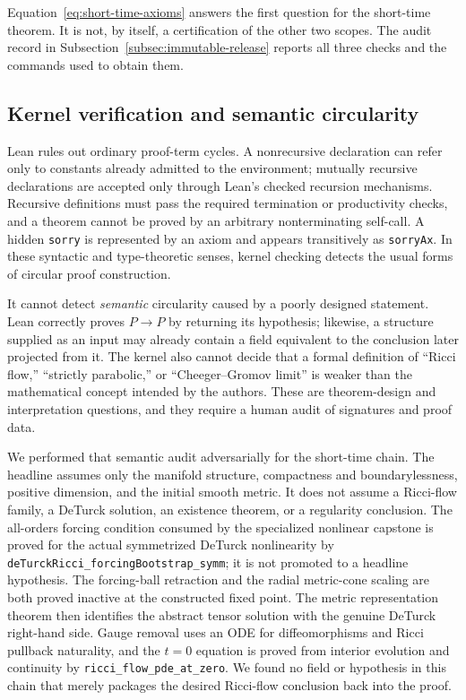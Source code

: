\documentclass[11pt]{article}
\theoremstyle{plain}
\theoremstyle{definition}
\theoremstyle{remark}
\newcommand{\leanref}[1]{\nolinkurl{#1}}
\begin{document}
Equation~\eqref{eq:short-time-axioms} answers the first question for the
short-time theorem.  It is not, by itself, a certification of the other two
scopes.  The audit record in Subsection~\ref{subsec:immutable-release} reports
all three checks and the commands used to obtain them.

\subsection{Kernel verification and semantic circularity}
\label{subsec:kernel-circularity}

Lean rules out ordinary proof-term cycles.  A nonrecursive declaration can
refer only to constants already admitted to the environment; mutually
recursive declarations are accepted only through Lean's checked recursion
mechanisms.  Recursive definitions must pass the required termination or
productivity checks, and a theorem cannot be proved by an arbitrary
nonterminating self-call.  A hidden \texttt{sorry} is represented by
an axiom and appears transitively as \texttt{sorryAx}.  In these syntactic and
type-theoretic senses, kernel checking detects the usual forms of circular
proof construction.

It cannot detect \emph{semantic} circularity caused by a poorly designed
statement.  Lean correctly proves $P\to P$ by returning its hypothesis;
likewise, a structure supplied as an input may already contain a field
equivalent to the conclusion later projected from it.  The kernel also cannot
decide that a formal definition of ``Ricci flow,'' ``strictly parabolic,'' or
``Cheeger--Gromov limit'' is weaker than the mathematical concept intended by
the authors.  These are theorem-design and interpretation questions, and they
require a human audit of signatures and proof data.

We performed that semantic audit adversarially for the short-time chain.  The
headline assumes only the manifold structure, compactness and
boundarylessness, positive dimension, and the initial smooth metric.  It does
not assume a Ricci-flow family, a DeTurck solution, an existence theorem, or a
regularity conclusion.  The all-orders forcing condition consumed by the
specialized nonlinear capstone is proved for the actual symmetrized DeTurck
nonlinearity by \leanref{deTurckRicci_forcingBootstrap_symm}; it is not promoted
to a headline hypothesis.  The forcing-ball retraction and the radial
metric-cone scaling are both proved inactive at the constructed fixed point.
The metric representation theorem then identifies the abstract tensor
solution with the genuine DeTurck right-hand side.  Gauge removal uses an ODE
for diffeomorphisms and Ricci pullback naturality, and the $t=0$ equation is
proved from interior evolution and continuity by
\leanref{ricci_flow_pde_at_zero}.  We found no field or hypothesis in this
chain that merely packages the desired Ricci-flow conclusion back into the
proof.
\end{document}
